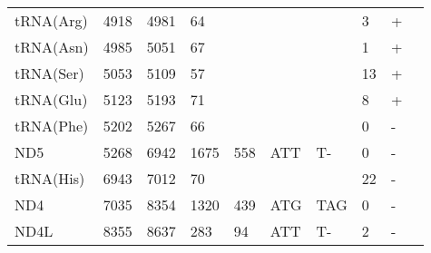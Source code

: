 \documentclass[../DISSERTACAO_MAIN.tex]{subfiles}
\begin{document}
\begin{longtable}{llllllllllllllllllllll}
			tRNA(Arg)    & 4918           & \multicolumn{2}{l}{4981}  & \multicolumn{2}{l}{64}         & \multicolumn{2}{l}{}          & \multicolumn{3}{l}{}                    & \multicolumn{3}{l}{}      & \multicolumn{3}{l}{3}          & \multicolumn{3}{l}{+}      & \multicolumn{2}{l}{} \\
			tRNA(Asn)    & 4985           & \multicolumn{2}{l}{5051}  & \multicolumn{2}{l}{67}         & \multicolumn{2}{l}{}          & \multicolumn{3}{l}{}                    & \multicolumn{3}{l}{}      & \multicolumn{3}{l}{1}          & \multicolumn{3}{l}{+}      & \multicolumn{2}{l}{} \\
			tRNA(Ser)    & 5053           & \multicolumn{2}{l}{5109}  & \multicolumn{2}{l}{57}         & \multicolumn{2}{l}{}          & \multicolumn{3}{l}{}                    & \multicolumn{3}{l}{}      & \multicolumn{3}{l}{13}         & \multicolumn{3}{l}{+}      & \multicolumn{2}{l}{} \\
			tRNA(Glu)    & 5123           & \multicolumn{2}{l}{5193}  & \multicolumn{2}{l}{71}         & \multicolumn{2}{l}{}          & \multicolumn{3}{l}{}                    & \multicolumn{3}{l}{}      & \multicolumn{3}{l}{8}          & \multicolumn{3}{l}{+}      & \multicolumn{2}{l}{} \\
			tRNA(Phe)    & 5202           & \multicolumn{2}{l}{5267}  & \multicolumn{2}{l}{66}         & \multicolumn{2}{l}{}          & \multicolumn{3}{l}{}                    & \multicolumn{3}{l}{}      & \multicolumn{3}{l}{0}          & \multicolumn{3}{l}{-}      & \multicolumn{2}{l}{} \\
			ND5          & 5268           & \multicolumn{2}{l}{6942}  & \multicolumn{2}{l}{1675}       & \multicolumn{2}{l}{558}       & \multicolumn{3}{l}{ATT}                 & \multicolumn{3}{l}{T-}    & \multicolumn{3}{l}{0}          & \multicolumn{3}{l}{-}      & \multicolumn{2}{l}{} \\
			tRNA(His)    & 6943           & \multicolumn{2}{l}{7012}  & \multicolumn{2}{l}{70}         & \multicolumn{2}{l}{}          & \multicolumn{3}{l}{}                    & \multicolumn{3}{l}{}      & \multicolumn{3}{l}{22}         & \multicolumn{3}{l}{-}      & \multicolumn{2}{l}{} \\
			ND4          & 7035           & \multicolumn{2}{l}{8354}  & \multicolumn{2}{l}{1320}       & \multicolumn{2}{l}{439}       & \multicolumn{3}{l}{ATG}                 & \multicolumn{3}{l}{TAG}   & \multicolumn{3}{l}{0}          & \multicolumn{3}{l}{-}      & \multicolumn{2}{l}{} \\
			ND4L         & 8355           & \multicolumn{2}{l}{8637}  & \multicolumn{2}{l}{283}        & \multicolumn{2}{l}{94}        & \multicolumn{3}{l}{ATT}                 & \multicolumn{3}{l}{T-}    & \multicolumn{3}{l}{2}          & \multicolumn{3}{l}{-}      & \multicolumn{2}{l}{} \\

\end{longtable}
\end{document}
